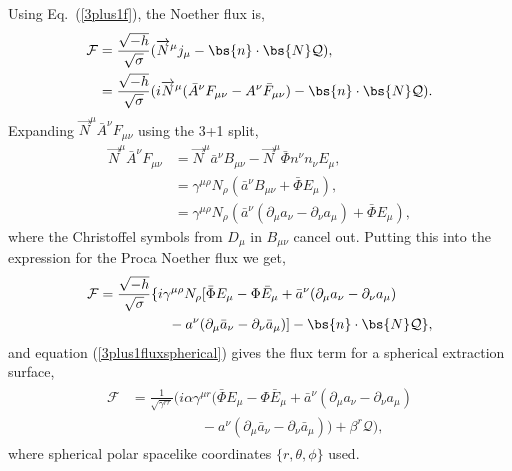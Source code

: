  Using Eq.~(\ref{3plus1f}), the Noether flux is,
\begin{align}
\mathcal{F} &= \frac{\sqrt{-h}}{\sqrt{\sigma}}(\overrightarrow{N}^\mu j_\mu - \bs{n} \cdot \bs{N}  \mathcal{Q}), \\
 &= \frac{\sqrt{-h}}{\sqrt{\sigma}} ( i\overrightarrow{N}^\mu (\bar{A}^\nu F_{\mu\nu} - A^\nu \bar{F}_{\mu\nu}) - \bs{n} \cdot \bs{N}  \mathcal{Q}).
 \end{align}
 Expanding $\overrightarrow{N}^\mu \bar{A}^\nu F_{\mu\nu}$ using the 3+1 split,
 \begin{align}
 \overrightarrow{N}^\mu \bar{A}^\nu F_{\mu\nu} &= \overrightarrow{N}^\mu \bar{a}^\nu B_{\mu\nu} - \overrightarrow{N}^\mu\bar{\Phi} n^\nu n_\nu E_\mu, \\
                            &= \gamma^{\mu\rho }{N}_\rho( \bar{a}^\nu B_{\mu\nu} +  \bar{\Phi}E_\mu),\\
                            &= \gamma^{\mu\rho }{N}_\rho( \bar{a}^\nu (\partial_\mu a_\nu - \partial_\nu a_\mu) +  \bar{\Phi}E_\mu),
 \end{align}
 where the Christoffel symbols from $D_\mu$ in $B_{\mu\nu}$ cancel out. Putting this into the expression for the Proca Noether flux we get,
 \begin{align}
  \begin{split}\mathcal{F}&= \frac{\sqrt{-h}}{\sqrt{\sigma}} \{ i\gamma^{\mu\rho}{N}_\rho [\bar{\Phi} E_\mu  -\Phi  \bar{E}_{\mu} +\bar{a}^\nu (\partial_\mu a_\nu - \partial_\nu a_\mu) \\ &\quad\quad\quad\quad\quad-  a^\nu (\partial_\mu \bar{a}_\nu - \partial_\nu \bar{a}_\mu)] - \bs{n} \cdot \bs{N}  \mathcal{Q}\},\end{split} 
 \end{align}
 and equation (\ref{3plus1fluxspherical}) gives the flux term for a spherical extraction surface,
 \begin{align} \begin{split}
\mathcal{F}&= \frac{1}{\sqrt{\gamma^{rr}}} ( i\alpha\gamma^{\mu r} ( \bar{\Phi} E_\mu - {\Phi} \bar{E}_\mu + \bar{a}^\nu (\partial_\mu a_\nu - \partial_\nu a_\mu)  \\&\quad\quad\quad\quad\quad- {a}^\nu (\partial_\mu \bar{a}_\nu - \partial_\nu \bar{a}_\mu) ) + \beta^r  \mathcal{Q}),
 \end{split}\end{align}
 where spherical polar spacelike coordinates $\{r,\theta,\phi\}$ used.


